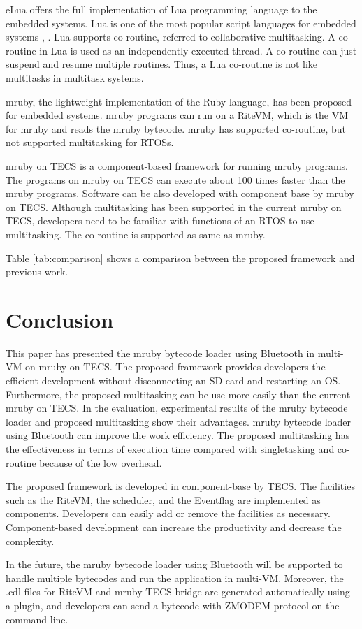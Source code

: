 \documentclass[conference,compsoc]{IEEEtran}
\begin{document}
eLua offers the full implementation of Lua programming language to the embedded systems.
Lua is one of the most popular script languages for embedded systems \cite{url:Lua}, \cite{par:Lua}.
Lua supports co-routine, referred to collaborative multitasking.
A co-routine in Lua is used as an independently executed thread.
A co-routine can just suspend and resume multiple routines.
Thus, a Lua co-routine is not like multitasks in multitask systems.

mruby, the lightweight implementation of the Ruby language, has been proposed for embedded systems.
mruby programs can run on a RiteVM, which is the VM for mruby and reads the mruby bytecode.
mruby has supported co-routine, but not supported multitasking for RTOSs.

mruby on TECS is a component-based framework for running mruby programs.
The programs on mruby on TECS can execute about 100 times faster than the mruby programs.
Software can be also developed with component base by mruby on TECS.
Although multitasking has been supported in the current mruby on TECS, developers need to be familiar with functions of an RTOS to use multitasking.
The co-routine is supported as same as mruby.

Table \ref{tab:comparison} shows a comparison between the proposed framework and previous work.
 
\section{Conclusion}
\label{sec:Conclusion}
This paper has presented the mruby bytecode loader using Bluetooth in multi-VM on mruby on TECS.
The proposed framework provides developers the efficient development without disconnecting an SD card and restarting an OS.
Furthermore, the proposed multitasking can be use more easily than the current mruby on TECS.
In the evaluation, experimental results of the mruby bytecode loader and proposed multitasking show their advantages.
mruby bytecode loader using Bluetooth can improve the work efficiency.
The proposed multitasking has the effectiveness in terms of execution time compared with singletasking and co-routine because of the low overhead.

The proposed framework is developed in component-base by TECS.
The facilities such as the RiteVM, the scheduler, and the Eventflag are implemented as components.
Developers can easily add or remove the facilities as necessary.
Component-based development can increase the productivity and decrease the complexity.

In the future, the mruby bytecode loader using Bluetooth will be supported to handle multiple bytecodes and run the application in multi-VM.
Moreover, the .cdl files for RiteVM and mruby-TECS bridge are generated automatically using a plugin, and developers can send a bytecode with ZMODEM protocol on the command line.


\end{document}
